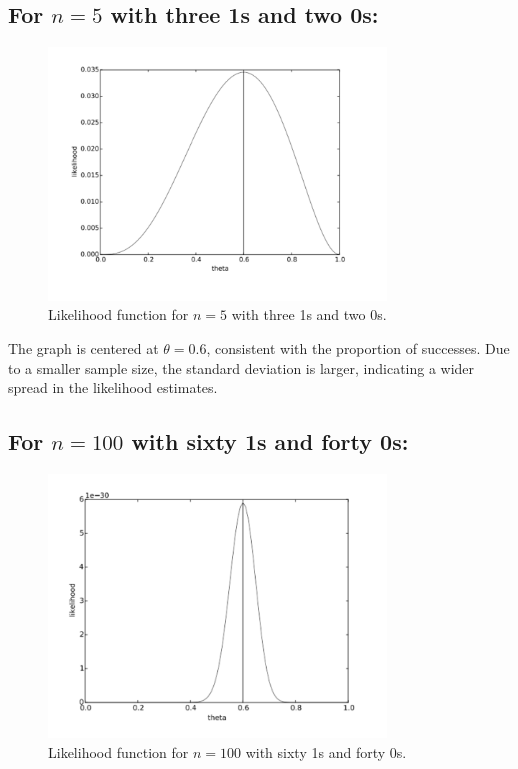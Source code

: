 \documentclass[10pt]{article}
\begin{document}
\subsection*{For \( n = 5 \) with three 1s and two 0s:}
\begin{figure}[h!]
  \centering
  \includegraphics[width=0.8\textwidth]{image1.png}
  \caption{Likelihood function for \( n = 5 \) with three 1s and two 0s.}
\end{figure}

The graph is centered at \( \theta = 0.6 \), consistent with the proportion of successes. Due to a smaller sample size, the standard deviation is larger, indicating a wider spread in the likelihood estimates.

\subsection*{For \( n = 100 \) with sixty 1s and forty 0s:}
\begin{figure}[h!]
  \centering
  \includegraphics[width=0.8\textwidth]{image2.png}
  \caption{Likelihood function for \( n = 100 \) with sixty 1s and forty 0s.}
\end{figure}
\end{document}
